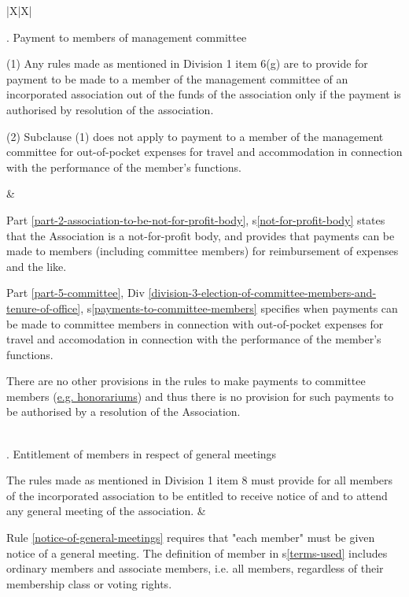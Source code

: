 \documentclass[../constitution.tex]{subfiles}
\begin{document}
{\def\arraystretch{1.3}
\begin{xltabular}{\textwidth}{ |X|X| }

. Payment to members of management committee 

\bigskip

(1) Any rules made as mentioned in Division 1 item 6(g) are to provide 
for payment to be made to a member of the management committee of 
an incorporated association out of the funds of the association only if 
the payment is authorised by resolution of the association. 

\bigskip

(2) Subclause (1) does not apply to payment to a member of the 
management committee for out-of-pocket expenses for travel and 
accommodation in connection with the performance of the member's 
functions. 

&

Part \ref{part-2-association-to-be-not-for-profit-body}, s\ref{not-for-profit-body} states that the Association is a not-for-profit body, and provides that payments can be made to members (including committee members) for reimbursement of expenses and the like.

\bigskip

Part \ref{part-5-committee}, Div \ref{division-3-election-of-committee-members-and-tenure-of-office}, s\ref{payments-to-committee-members} specifies when payments can be made to committee members in connection with out-of-pocket expenses for travel and accomodation in connection with the performance of the member's functions.

\bigskip

There are no other provisions in the rules to make payments to committee members (\href{https://www.commerce.wa.gov.au/books/inc-guide-incorporated-associations-western-australia/paying-committee-members}{e.g. honorariums}) and thus there is no provision for such payments to be authorised by a resolution of the Association.

\\

. Entitlement of members in respect of general meetings 

\bigskip

 The rules made as mentioned in Division 1 item 8 must provide for all 
members of the incorporated association to be entitled to receive 
notice of and to attend any general meeting of the association. 
&

Rule \ref{notice-of-general-meetings} requires that "each member" must be given notice of a general meeting. The definition of member in s\ref{terms-used} includes ordinary members and associate members, i.e. all members, regardless of their membership class or voting rights.


\end{xltabular}}
\end{document}
